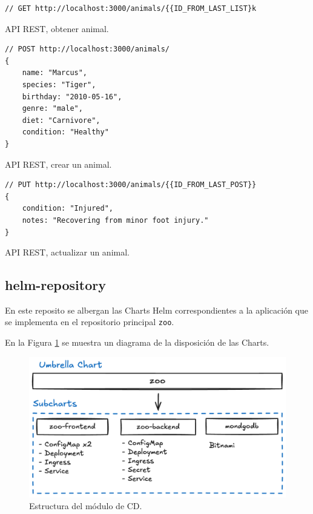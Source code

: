 \begin{listing}[!ht]
  \begin{verbatim}
// GET http://localhost:3000/animals/{{ID_FROM_LAST_LIST}k
  \end{verbatim}
  \caption{API REST, obtener animal.}
\end{listing}

\begin{listing}[!ht]
  \begin{verbatim}
// POST http://localhost:3000/animals/
{
    name: "Marcus",
    species: "Tiger",
    birthday: "2010-05-16",
    genre: "male",
    diet: "Carnivore",
    condition: "Healthy"
}
  \end{verbatim}
  \caption{API REST, crear un animal.}
\end{listing}

\begin{listing}[!ht]
  \begin{verbatim}
// PUT http://localhost:3000/animals/{{ID_FROM_LAST_POST}}
{
    condition: "Injured",
    notes: "Recovering from minor foot injury."
}
  \end{verbatim}
  \caption{API REST, actualizar un animal.}
\end{listing}

\subsection{helm-repository}

En este reposito se albergan las Charts Helm correspondientes a la aplicación que se implementa en el repositorio principal \texttt{zoo}.

En la Figura \ref{fig:charts_diagram} se muestra un diagrama de la disposición de las Charts.

\begin{figure}
  \centerline{\includegraphics[width=13.5cm]{figuras/charts_diagram}}
  \caption{Estructura del módulo de CD.}
  \label{fig:charts_diagram}
\end{figure}

